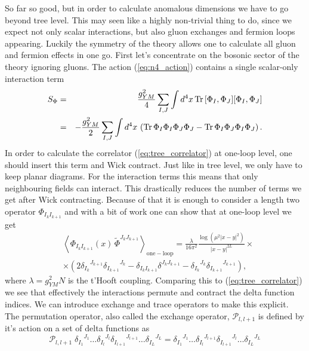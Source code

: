 So far so good, but in order to calculate anomalous dimensions we have to go beyond tree level. 
This may seen like a highly non-trivial thing to do, since we expect not only scalar interactions, but also gluon exchanges and fermion loops appearing. 
Luckily the symmetry of the theory allows one to calculate all gluon and fermion effects in one go. 
First let's concentrate on the bosonic sector of the theory ignoring gluons. 
The action (\ref{eq:n4_action}) contains a single scalar-only interaction term
\begin{eqnarray}
S_{\Phi} & = &  \frac{g_{YM}^2}{4} \sum_{I,J} \int d^4 x \, \mathrm{Tr} \, [\Phi_I, \Phi_J] [\Phi_I, \Phi_J] \nonumber \\
& = & - \frac{g_{YM}^2}{2} \sum_{I,J} \int d^4 x \, \left( \mathrm{Tr} \, \Phi_I\Phi_I\Phi_J\Phi_J - \mathrm{Tr} \, \Phi_I\Phi_J\Phi_I\Phi_J \right).
\end{eqnarray} 
In order to calculate the correlator (\ref{eq:tree_correlator}) at one-loop level, one should insert this term and Wick contract. 
Just like in tree level, we only have to keep planar diagrams. 
For the interaction terms this means that only neighbouring fields can interact. 
This drastically reduces the number of terms we get after Wick contracting. 
Because of that it is enough to consider a length two operator $\Phi_{I_k I_{k+1}}$ and with a bit of work one can show that at one-loop level we get
\begin{eqnarray}
	 & \left< \Phi_{I_k I_{k+1}}(x) \, \tilde{\Phi}^{J_k J_{k+1}} \right>_{\mathrm{one-loop}}  = \frac{\lambda}{16\pi^2} \frac{\log (\mu^2|x-y|^2)}{|x-y|^{2L}} \times \nonumber \\ 
	& \times  \left( 2 {\delta_{I_k}}^{J_{k+1}} {\delta_{I_{k+1}}}^{J_{k}} - \delta_{I_k I_{k+1}} \delta^{J_k J_{k+1}} - {\delta_{I_k}}^{J_{k}} {\delta_{I_{k+1}}}^{J_{k+1}} \right),
	\label{eq:loop_correlator}
\end{eqnarray}
where $\lambda = g_{YM}^2 N$ is the t'Hooft coupling. 
Comparing this to (\ref{eq:tree_correlator}) we see that effectively the interactions permute and contract the delta function indices. 
We can introduce exchange and trace operators to make this explicit. 
The permutation operator, also called the exchange operator, $\mathcal{P}_{l,l+1}$ is defined by it's action on a set of delta functions as
\begin{equation}
	\label{eq:spin_perm}
	\mathcal{P}_{l,l+1} \; {\delta_{I_{1}}}^{J_{1}} \dots {\delta_{I_{l}}}^{J_{l}} {\delta_{I_{l+1}}}^{J_{l+1}} \dots {\delta_{I_{L}}}^{J_{L}} = {\delta_{I_{1}}}^{J_{1}} \dots {\delta_{I_{l}}}^{J_{l+1}} {\delta_{I_{l+1}}}^{J_{l}} \dots {\delta_{I_{L}}}^{J_{L}}
\end{equation}
